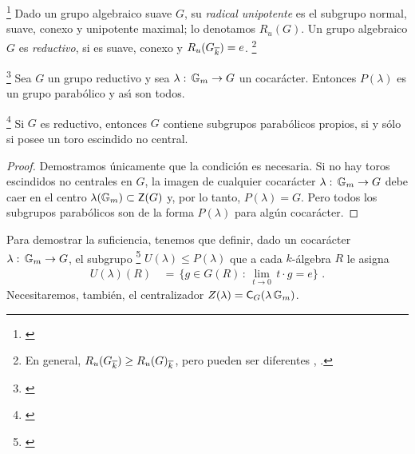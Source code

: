 \begin{defReductivo}\label{def:reductivo}
	\footnote{
		\cite[\S~6.46]{MilneAlgebraicGroups}
	}
	Dado un grupo algebraico suave $G$, su \emph{radical unipotente} es el
	subgrupo normal, suave, conexo y unipotente maximal; lo denotamos
	$R_u(G)$. Un grupo algebraico $G$ es \emph{reductivo}, si es suave,
	conexo y $R_u(G_{\algclos k})=e$.%
	\footnote{
		En general, $R_u(G_{\algclos k})\geq R_u(G)_{\algclos k}$, pero
		pueden ser diferentes \cite[\S~6.47]{MilneAlgebraicGroups},
		\cite[pp.xiv,xv]{ConradGabberPrasadPseudoreductive}.
	}
\end{defReductivo}

\begin{teoElGrupoDeUnaCurva}\label{thm:elgrupodeunacurva}
	\footnote{
		\cite[Theorem~25.1]{MilneAlgebraicGroups}
	}
	Sea $G$ un grupo reductivo y sea
	$\lambda:\,\multiplicativo\rightarrow G$ un cocar\'{a}cter. Entonces
	$P(\lambda)$ es un grupo parab\'{o}lico y as\'{\i} son todos.
\end{teoElGrupoDeUnaCurva}

\begin{propoCocaracteresYParabolicosPropios}%
	\label{propo:cocaracteres:parabolicospropios}
	\footnote{
		\cite[Proposition~25.2]{MilneAlgebraicGroups}
	}
	Si $G$ es reductivo, entonces $G$ contiene subgrupos parab\'{o}licos
	propios, si y s\'{o}lo si posee un toro escindido no central.
\end{propoCocaracteresYParabolicosPropios}

\begin{proof}
	Demostramos \'{u}nicamente que la condici\'{o}n es necesaria. Si no hay
	toros escindidos no centrales en $G$, la imagen de cualquier
	cocar\'{a}cter $\lambda:\,\multiplicativo\rightarrow G$ debe caer en el
	centro $\lambda(\multiplicativo)\subset\centre(G)$ y, por lo tanto,
	$P(\lambda)=G$. Pero todos los subgrupos parab\'{o}licos son de la
	forma $P(\lambda)$ para alg\'{u}n cocar\'{a}cter.
\end{proof}

Para demostrar la suficiencia, tenemos que definir, dado un cocar\'{a}cter
$\lambda:\,\multiplicativo\rightarrow G$, el subgrupo%
\footnote{
	\cite[Proposition~13.29]{MilneAlgebraicGroups}
}
$U(\lambda)\leq P(\lambda)$ que a cada $k$-\'{a}lgebra $R$ le asigna
\begin{align*}
	U(\lambda)(R) & \,=\,\Big\{g\in G(R)\,:\,\lim_{t\to 0}\,t\cdot g=e
		\Big\}
	\text{ .}
\end{align*}
%
Necesitaremos, tambi\'{e}n, el centralizador
$Z(\lambda)=\centraliza[G](\lambda\,\multiplicativo)$.

